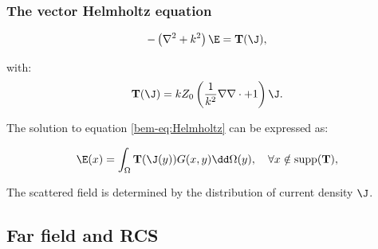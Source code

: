 \documentclass[beamer]{standalone}
\begin{document}
\begin{frame}
    \frametitle{The vector Helmholtz equation}
    \begin{equation}
    -\left(\nabla^2+k^2\right)\E = \mathbf T(\J),
    \label{bem-eq:Helmholtz}
\end{equation}

with: 
\begin{equation}
    \mathbf T(\J) = kZ_0\left(\frac1{k^2}\nabla\nabla\cdot+1\right)\J.
\end{equation}

\pause
The solution to equation \eqref{bem-eq:Helmholtz} can be expressed as:

\begin{equation}
    \E(x) = \int_\Omega \mathbf T(\J(y))G(x,y)\dd\Omega(y),\quad \forall x\notin\mathrm{supp}(\mathbf T),
    \label{bem-eq:sol-helmholtz}
\end{equation}
 
The scattered field is determined by the distribution of current density $\J$.
\end{frame}


\subsection{Far field and RCS}
\end{document}
